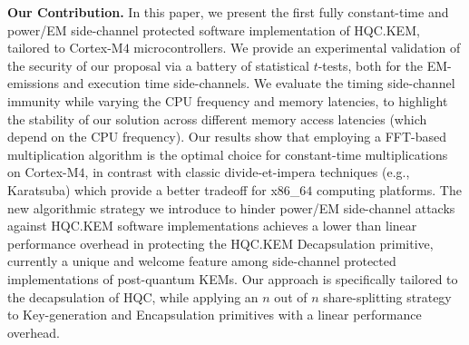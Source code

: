 \noindent\textbf{Our Contribution.} In this paper, we present the first fully 
constant-time and power/EM side-channel protected software implementation of HQC.KEM, tailored to Cortex-M$4$ microcontrollers. 
We provide an experimental validation of the security of our proposal via a 
battery of statistical $t$-tests, both for the EM-emissions and execution time 
side-channels.
We evaluate the timing side-channel immunity while varying the CPU frequency and 
memory latencies, to highlight the stability of our solution across different 
memory access latencies (which depend on the CPU frequency). 
Our results show that employing a FFT-based multiplication algorithm is the 
optimal choice for constant-time multiplications on Cortex-M$4$, in contrast 
with classic divide-et-impera techniques (e.g., Karatsuba) which provide a 
better tradeoff for x$86$\_$64$ computing platforms.
The new algorithmic strategy we introduce to hinder power/EM side-channel 
attacks against HQC.KEM software implementations achieves a lower than linear 
performance overhead in protecting the HQC.KEM Decapsulation primitive, 
currently a unique and welcome feature among side-channel protected 
implementations of post-quantum  KEMs.
Our approach is specifically tailored to the decapsulation of 
HQC, while applying an $n$ out of $n$ share-splitting strategy to 
Key-generation and Encapsulation primitives with a linear 
performance overhead.
